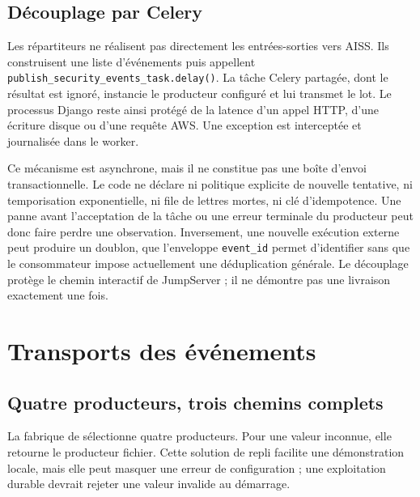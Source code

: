 \documentclass[11pt,a4paper,oneside]{report}
\theoremstyle{definition}
\theoremstyle{plain}
\begin{document}
\subsection{Découplage par Celery}

Les répartiteurs ne réalisent pas directement les entrées-sorties vers AISS.
Ils construisent une liste d'événements puis appellent
\texttt{publish\_security\_events\_task.delay()}. La tâche Celery partagée,
dont le résultat est ignoré, instancie le producteur configuré et lui transmet
le lot. Le processus Django reste ainsi protégé de la latence d'un appel HTTP,
d'une écriture disque ou d'une requête AWS. Une exception est interceptée et
journalisée dans le worker.

Ce mécanisme est asynchrone, mais il ne constitue pas une boîte d'envoi
transactionnelle. Le code ne déclare ni politique explicite de nouvelle
tentative, ni temporisation exponentielle, ni file de lettres mortes, ni clé
d'idempotence. Une panne avant l'acceptation de la tâche ou une erreur
terminale du producteur peut donc faire perdre une observation. Inversement,
une nouvelle exécution externe peut produire un doublon, que l'enveloppe
\texttt{event\_id} permet d'identifier sans que le consommateur impose
actuellement une déduplication générale. Le découplage protège le chemin
interactif de JumpServer ; il ne démontre pas une livraison exactement une
fois.

\section{Transports des événements}

\subsection{Quatre producteurs, trois chemins complets}

La fabrique de  sélectionne quatre
producteurs. Pour une valeur inconnue, elle retourne le producteur fichier.
Cette solution de repli facilite une démonstration locale, mais elle peut
masquer une erreur de configuration ; une exploitation durable devrait
rejeter une valeur invalide au démarrage.
\end{document}
